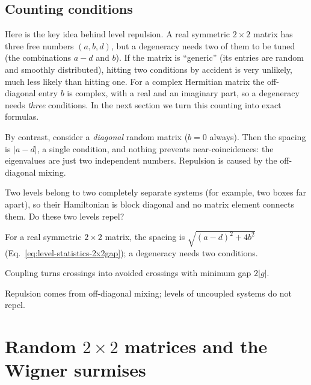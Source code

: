 \subsection{Counting conditions}

Here is the key idea behind level repulsion. A real symmetric $2\times2$ matrix has three free numbers $(a,b,d)$, but a degeneracy needs two of them to be tuned (the combinations $a-d$ and $b$). If the matrix is ``generic'' (its entries are random and smoothly distributed), hitting two conditions by accident is very unlikely, much less likely than hitting one. For a complex Hermitian matrix the off-diagonal entry $b$ is complex, with a real and an imaginary part, so a degeneracy needs \emph{three} conditions. In the next section we turn this counting into exact formulas.

By contrast, consider a \emph{diagonal} random matrix ($b=0$ always). Then the spacing is $|a-d|$, a single condition, and nothing prevents near-coincidences: the eigenvalues are just two independent numbers. Repulsion is caused by the off-diagonal mixing.

\begin{checkpoint}
Two levels belong to two completely separate systems (for example, two boxes far apart), so their Hamiltonian is block diagonal and no matrix element connects them. Do these two levels repel?
\end{checkpoint}

\begin{keyideas}
\item For a real symmetric $2\times2$ matrix, the spacing is $\sqrt{(a-d)^2+4b^2}$ (Eq.~\eqref{eq:level-statistics-2x2gap}); a degeneracy needs two conditions.
\item Coupling turns crossings into avoided crossings with minimum gap $2|g|$.
\item Repulsion comes from off-diagonal mixing; levels of uncoupled systems do not repel.
\end{keyideas}

\section{Random $2\times2$ matrices and the Wigner surmises}\label{sec:level-statistics-wigner}

